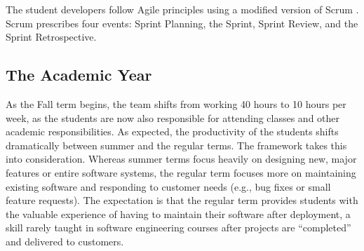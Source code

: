 

The student developers follow Agile principles \cite{agilemanifesto} using a modified version of Scrum \cite{thescrumguide}. Scrum prescribes four events: Sprint Planning, the Sprint, Sprint Review, and the Sprint Retrospective. %

\subsection{The Academic Year}
As the Fall term begins, the team shifts from working 40 hours to 10 hours per week, as the students are now also responsible for attending classes and other academic responsibilities. As expected, the productivity of the students shifts dramatically between summer and the regular terms. The framework takes this into consideration. Whereas summer terms focus heavily on designing new, major features or entire software systems, the regular term focuses more on maintaining existing software and responding to customer needs (e.g., bug fixes or small feature requests). The expectation is that the regular term provides students with the valuable experience of having to maintain their software after deployment, a skill rarely taught in software engineering courses after projects are ``completed'' and delivered to customers. 


